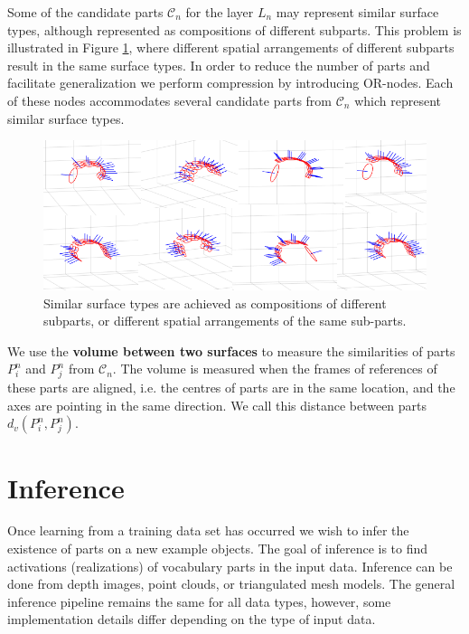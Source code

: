 \documentclass[conference]{IEEEtran}
\begin{document}
{Some of the candidate parts $\mathcal{C}_n$ for the layer $L_n$ may
represent similar surface types, although represented as
compositions of different subparts. This problem is illustrated in
Figure \ref{fig:OrNodes}, where different spatial arrangements of
different subparts result in the same surface types. In order to
reduce the number of parts and facilitate generalization we perform
compression by introducing OR-nodes. Each of these nodes
accommodates several candidate parts from $\mathcal{C}_n$ which
represent similar surface types.

\begin{figure}
\centering
\includegraphics[scale=0.6]{OrNode}
\caption{Similar surface types are achieved as compositions of
different subparts, or different spatial arrangements of the same
sub-parts.} \label{fig:OrNodes}
\end{figure}

We use the \textbf{volume between two surfaces} to measure the
similarities of parts $P_i^n$ and $P_j^n$ from $\mathcal{C}_n$. The
volume is measured when the frames of references of these parts are
aligned, i.e. the centres of parts are in the same location, and the
axes are pointing in the same direction. We call this distance
between parts $d_v(P_i^n, P_j^n)$.

\section{Inference\label{sec:Inference}}

Once learning from a training data set has occurred we wish to infer
the existence of parts on a new example objects. The goal of
inference is to find activations (realizations) of vocabulary parts
in the input data. Inference can be done from depth images, point
clouds, or triangulated mesh models. The general inference pipeline
remains the same for all data types, however, some implementation
details differ depending on the type of input data.

}
\end{document}
